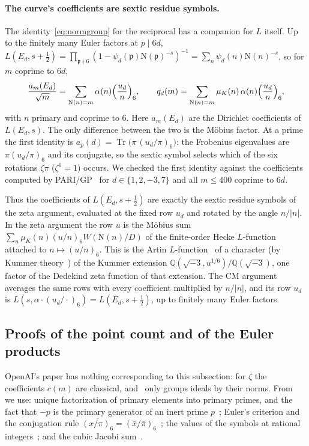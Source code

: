 \documentclass[11pt]{article}
\numberwithin{equation}{section}
\newcommand{\N}{\mathrm N}
\newcommand{\muk}{\mu_K}
\newcommand{\Tr}{\operatorname{Tr}}
\begin{document}
\paragraph{The curve's coefficients are sextic residue symbols.} The identity~\eqref{eq:normgroup} for
the reciprocal has a companion for $L$ itself. Up to the finitely many Euler factors at $p\mid6d$,
$L(E_d,s+\frac12)=\prod_{\mathfrak p\nmid6}(1-\psi_d(\mathfrak p)\N(\mathfrak p)^{-s})^{-1}=\sum_n\psi_d(n)\N(n)^{-s}$,
so for $m$ coprime to $6d$,
\begin{equation}\label{eq:d012}
 \frac{a_m(E_d)}{\sqrt m}=\sum_{\N(n)=m}\alpha(n)\Bigl(\frac{u_d}n\Bigr)_6,\qquad
 q_d(m)=\sum_{\N(n)=m}\muk(n)\,\alpha(n)\Bigl(\frac{u_d}n\Bigr)_6 ,
\end{equation}
with $n$ primary and coprime to $6$. Here $a_m(E_d)$ are the Dirichlet coefficients of $L(E_d,s)$. The only
difference between the two is the M\"obius factor. At a prime the first identity is
$a_p(d)=\Tr\bigl(\pi\,(u_d/\pi)_6\bigr)$: the Frobenius eigenvalues are $\pi(u_d/\pi)_6$ and its conjugate, so the
sextic symbol selects which of the six rotations $\zeta\pi$ ($\zeta^6=1$) occurs. We checked the first identity
against the coefficients computed by PARI/GP~\cite{PARI} for $d\in\{1,2,-3,7\}$ and all $m\le400$ coprime to $6d$.

Thus the coefficients of $L(E_d,s+\frac12)$ are exactly the sextic residue symbols of the zeta argument,
evaluated at the fixed row $u_d$ and rotated by the angle $n/|n|$. In the zeta argument the row $u$ is the
M\"obius sum $\sum_n\muk(n)(u/n)_6W(\N(n)/D)$ of the finite-order Hecke $L$-function attached to
$n\mapsto(u/n)_6$. This is the Artin $L$-function~\cite[Ch.~VII, \S10]{Neukirch} of a character (by Kummer theory~\cite[Ch.~IV, \S3]{Neukirch}) of the Kummer extension
$\mathbb Q(\sqrt{-3},u^{1/6})/\mathbb Q(\sqrt{-3})$, one factor of the Dedekind zeta function of that
extension. The CM argument averages the same rows with every
coefficient multiplied by $n/|n|$, and its row $u_d$ is $L(s,\alpha\cdot(u_d/\cdot)_6)=L(E_d,s+\frac12)$, up to
finitely many Euler factors.


\subsection{Proofs of the point count and of the Euler products}\label{sec:b1-pointproofs}
OpenAI's paper has nothing corresponding to this subsection: for $\zeta$ the coefficients $c(m)$ are classical,
and~\cite[(2.3)]{ZG} only groups ideals by their norms. From~\cite[Sections~2--3]{QF} we use: unique
factorization of primary elements into primary primes, and the fact that $-p$ is the primary generator of an
inert prime $p$~\cite[Proposition~11]{QF}; Euler's criterion and the conjugation rule
$\overline{(x/\pi)_6}=(\bar x/\bar\pi)_6$~\cite[Section~3.1]{QF}; the values of the symbols at rational
integers~\cite[(3.5)--(3.6)]{QF}; and the cubic Jacobi sum~\cite[Theorem~15]{QF}.
\end{document}
